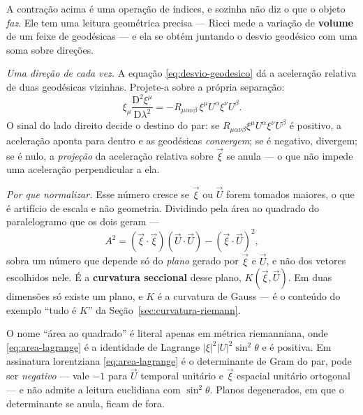 \documentclass[12pt,a4paper,oneside]{book}
\theoremstyle{rgplain}
\theoremstyle{rgremark}
\newcommand{\D}{\mathrm{D}}
\begin{document}
A contração acima é uma operação de índices, e sozinha não diz o que o objeto
\emph{faz}. Ele tem uma leitura geométrica precisa --- Ricci mede a variação
de \textbf{volume} de um feixe de geodésicas --- e ela se obtém juntando o
desvio geodésico com uma soma sobre direções.

\emph{Uma direção de cada vez.} A equação \eqref{eq:desvio-geodesico} dá a
aceleração relativa de duas geodésicas vizinhas. Projete-a sobre a própria
separação:
\[
  \xi_\mu\frac{\D^2\xi^\mu}{\D\lambda^2}
  =-R_{\mu\alpha\nu\beta}\,\xi^\mu U^\alpha\xi^\nu U^\beta .
\]
O sinal do lado direito decide o destino do par: se
$R_{\mu\alpha\nu\beta}\xi^\mu U^\alpha\xi^\nu U^\beta$ é positivo, a
aceleração aponta para dentro e as geodésicas \emph{convergem}; se é
negativo, divergem; se é nulo, a \emph{projeção} da aceleração relativa
sobre $\vec\xi$ se anula --- o que não impede uma aceleração perpendicular
a ela.

\emph{Por que normalizar.} Esse número cresce se $\vec\xi$ ou $\vec U$ forem
tomados maiores, o que é artifício de escala e não geometria. Dividindo pela
área ao quadrado do paralelogramo que os dois geram ---
\begin{equation}
  A^2=(\vec\xi\cdot\vec\xi)(\vec U\cdot\vec U)-(\vec\xi\cdot\vec U)^2 ,
  \label{eq:area-lagrange}
\end{equation}
sobra um número que depende só do \emph{plano} gerado por $\vec\xi$ e
$\vec U$, e não dos vetores escolhidos nele. É a \textbf{curvatura
seccional} desse plano, $K(\vec\xi,\vec U)$. Em duas dimensões só existe um
plano, e $K$ é a curvatura de Gauss --- é o conteúdo do exemplo ``tudo é
$K$'' da Seção~\ref{sec:curvatura-riemann}.

\begin{atencao}
O nome ``área ao quadrado'' é literal apenas em métrica riemanniana, onde
\eqref{eq:area-lagrange} é a identidade de Lagrange
$|\xi|^2|U|^2\sin^2\theta$ e é positiva. Em assinatura lorentziana
\eqref{eq:area-lagrange} é o determinante de Gram do par, pode ser
\emph{negativo} --- vale $-1$ para $\vec U$ temporal unitário e $\vec\xi$
espacial unitário ortogonal --- e não admite a leitura euclidiana com
$\sin^2\theta$. Planos degenerados, em que o determinante se anula, ficam
de fora.
\end{atencao}
\end{document}
